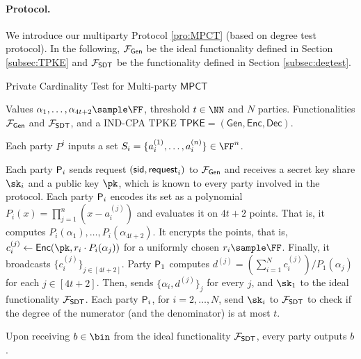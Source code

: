 \paragraph{Protocol.}

We introduce our multiparty Protocol \ref{pro:MPCT} (based on degree test protocol). In the following, $\mathcal{F}_\mathsf{Gen}$ be the ideal functionality defined in Section \ref{subsec:TPKE} and $\mathcal{F}_\mathsf{SDT}$ be the functionality defined in Section \ref{subsec:degtest}.

\begin{algorithm}
\caption{Private Cardinality Test for Multi-party $\mathsf{MPCT}$}
\label{pro:MPCT}
\begin{algorithmic}[1]
\REQUIRE Values $\alpha_{1}, \dots, \alpha_{4t+2}\sample \FF$, threshold $t\in\NN$ and $N$ parties. Functionalities $\mathcal{F}_{\mathsf{Gen}}$ and $\mathcal{F}_\mathsf{SDT}$, and a IND-CPA TPKE $\mathsf{TPKE}=(\mathsf{Gen},\mathsf{Enc},\mathsf{Dec})$.

\ENSURE Each party $P^i$ inputs a set $S_{i}=\{a_i^{(1)},\dots,a_i^{(n)}\} \in \FF^n$.

\STATE Each party $\mathsf{P}_i$  sends  request $(\mathsf{sid},\mathsf{request}_i)$ to $\mathcal{F}_{\mathsf{Gen}}$ and receives a secret key share $\sk_i$ and a public key $\pk$, which is known to every party involved in the protocol.
\STATE Each party $\mathsf{P}_i$ encodes its set as a polynomial $P_i(x)=\prod_{j=1}^n (x-a_i^{(j)})$ and evaluates it on $4t+2$ points. That is, it computes $P_i(\alpha_{1}), \dots, P_i(\alpha_{4t+2})$. It encrypts the points, that is, $c_i^{(j)}\leftarrow \mathsf{Enc}(\pk,r_i\cdot P_i(\alpha_j))$ for a uniformly chosen $r_i\sample \FF$. Finally, it broadcasts $\{c_i^{(j)}\}_{j\in[4t+2]}$.
\STATE Party $\mathsf{P}_1$ computes $d^{(j)}=(\sum_{i=1}^N c_i^{(j)})/P_1(\alpha_j)$ for each $j\in [4t+2]$. Then, sends $\{\alpha_i,d^{(j)}\}_{j}$ for every $j$, and $\sk_1$ to the ideal functionality $\mathcal{F}_{\mathsf{SDT}}$. Each party $\mathsf{P}_i$, for $i=2,\dots, N$, send $\sk_i$ to $\mathcal{F}_{\mathsf{SDT}}$ to check if the degree of the numerator (and the denominator) is at most $t$.

\STATE Upon receiving $b\in\bin$ from the ideal functionality $\mathcal{F}_{\mathsf{SDT}}$, every party outputs $b$.
\end{algorithmic}
\end{algorithm}


